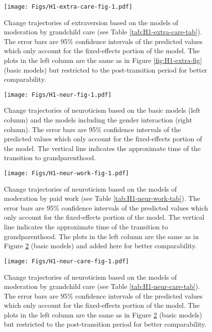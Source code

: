 \documentclass[
  english,
  man, noextraspace]{apa7}
\begin{document}
\begin{appendix}
\begin{figure}
\centering
\texttt{[image: Figs/H1-extra-care-fig-1.pdf]}
\caption{\label{fig:H1-extra-care-fig}Change trajectories of extraversion based on
the models of moderation by grandchild care (see Table
\ref{tab:H1-extra-care-tab}). The error bars are 95\% confidence
intervals of the predicted values which only account for the
fixed-effects portion of the model. The plots in the left column are the
same as in Figure \ref{fig:H1-extra-fig} (basic models) but restricted
to the post-transition period for better comparability.}
\end{figure}








\begin{figure}
\centering
\texttt{[image: Figs/H1-neur-fig-1.pdf]}
\caption{\label{fig:H1-neur-fig}Change trajectories of neuroticism based on the
basic models (left column) and the models including the gender
interaction (right column). The error bars are 95\% confidence intervals
of the predicted values which only account for the fixed-effects portion
of the model. The vertical line indicates the approximate time of the
transition to grandparenthood.}
\end{figure}










\begin{figure}
\centering
\texttt{[image: Figs/H1-neur-work-fig-1.pdf]}
\caption{\label{fig:H1-neur-work-fig}Change trajectories of neuroticism based on
the models of moderation by paid work (see Table
\ref{tab:H1-neur-work-tab}). The error bars are 95\% confidence
intervals of the predicted values which only account for the
fixed-effects portion of the model. The vertical line indicates the
approximate time of the transition to grandparenthood. The plots in the
left column are the same as in Figure \ref{fig:H1-neur-fig} (basic
models) and added here for better comparability.}
\end{figure}









\begin{figure}
\centering
\texttt{[image: Figs/H1-neur-care-fig-1.pdf]}
\caption{\label{fig:H1-neur-care-fig}Change trajectories of neuroticism based on
the models of moderation by grandchild care (see Table
\ref{tab:H1-neur-care-tab}). The error bars are 95\% confidence
intervals of the predicted values which only account for the
fixed-effects portion of the model. The plots in the left column are the
same as in Figure \ref{fig:H1-neur-fig} (basic models) but restricted to
the post-transition period for better comparability.}
\end{figure}









\end{appendix}
\end{document}
